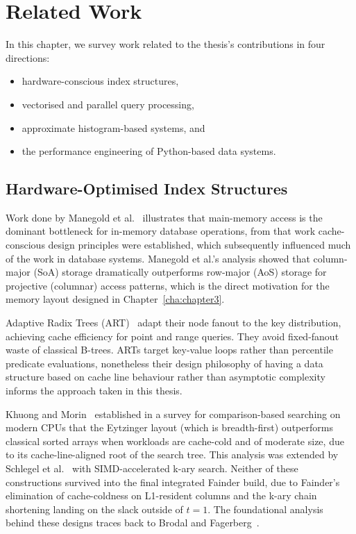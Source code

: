 \chapter{Related Work\label{cha:chapter5}}

In this chapter, we survey work related to the thesis's contributions in four directions: 

\begin{itemize}
    \item hardware-conscious index structures, 
    \item vectorised and parallel query processing, 
    \item approximate histogram-based systems, and 
    \item the performance engineering of Python-based data systems.
\end{itemize}

\section{Hardware-Optimised Index Structures}

Work done by Manegold et al.~\cite{manegold_2000} illustrates that main-memory access is the dominant bottleneck for in-memory database operations, from that work cache-conscious design principles were established, which subsequently influenced much of the work in database systems. Manegold et al.'s analysis showed that column-major (SoA) storage dramatically outperforms row-major (AoS) storage for projective (columnar) access patterns, which is the direct motivation for the memory layout designed in Chapter~\ref{cha:chapter3}.

Adaptive Radix Trees (ART)~\cite{leis_2013} adapt their node fanout to the key distribution, achieving cache efficiency for point and range queries. They avoid fixed-fanout waste of classical B-trees. ARTs target key-value loops rather than percentile predicate evaluations, nonetheless their design philosophy of having a data structure based on cache line behaviour rather than asymptotic complexity informs the approach taken in this thesis.

Khuong and Morin~\cite{khuong_morin_2017} established in a survey for comparison-based searching on modern CPUs that the Eytzinger layout (which is breadth-first) outperforms classical sorted arrays when workloads are cache-cold and of moderate size, due to its cache-line-aligned root of the search tree. This analysis was extended by Schlegel et al.~\cite{schlegel_2009} with SIMD-accelerated k-ary search. Neither of these constructions survived into the final integrated Fainder build, due to Fainder's elimination of cache-coldness on L1-resident columns and the k-ary chain shortening landing on the slack outside of $t=1$. The foundational analysis behind these designs traces back to Brodal and Fagerberg~\cite{brodal_fagerberg_2006}.

